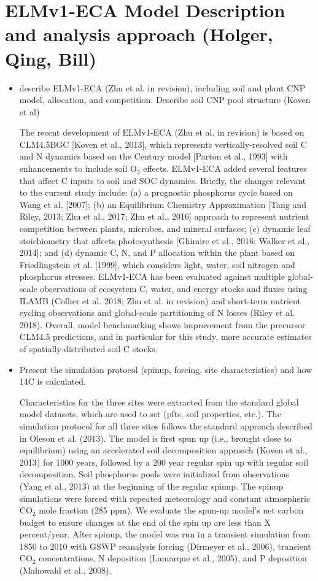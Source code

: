 \documentclass[11pt,a4paper]{article}
\begin{document}
\section*{ELMv1-ECA Model Description and analysis approach (Holger, Qing, Bill)}
\begin{itemize}
    \item describe ELMv1-ECA (Zhu et al. in revision), including soil and plant CNP model, allocation, and competition. Describe soil CNP pool structure (Koven et al)
    
    The recent development of ELMv1-ECA (Zhu et al. in revision) is based on CLM4.5BGC [Koven et al., 2013], which represents vertically-resolved soil C and N dynamics based on the Century model [Parton et al., 1993] with enhancements  to include soil O$_2$ effects. ELMv1-ECA added several features that affect C inputs to soil and SOC dynamics. Briefly, the changes relevant to the current study include: (a) a prognostic phosphorus cycle based on Wang et al. [2007]; (b) an Equilibrium Chemistry Approximation [Tang and Riley, 2013; Zhu et al., 2017; Zhu et al., 2016]  approach to represent nutrient competition between plants, microbes, and mineral surfaces; (c) dynamic leaf stoichiometry that affects photosynthesis [Ghimire et al., 2016; Walker et al., 2014]; and (d) dynamic C, N, and P allocation within the plant based on Friedlingstein et al. [1999], which considers light, water, soil nitrogen and phosphorus stresses. ELMv1-ECA has been evaluated against multiple global-scale observations of ecosystem C, water, and energy stocks and fluxes using ILAMB (Collier et al. 2018; Zhu et al. in revision) and short-term nutrient cycling observations and global-scale partitioning of N losses (Riley et al. 2018). Overall, model benchmarking shows improvement from the precursor CLM4.5 predictions, and in particular for this study, more accurate estimates of spatially-distributed soil C stocks.
    
    \item Present the simulation protocol (spinup, forcing, site characteristics) and how 14C is calculated.
    
    Characteristics for the three sites were extracted from the standard global model datasets, which are used to set (pfts, soil properties, etc.). The simulation protocol for all three sites follows the standard approach described in Oleson et al. (2013). The model is first spun up (i.e., brought close to equilibrium) using an accelerated soil decomposition approach (Koven et al., 2013) for 1000 years, followed by a 200 year regular spin up with regular soil decomposition. Soil phosphorus pools were initialized from observations (Yang et al., 2013) at the beginning of the regular spinup. The spinup simulations were forced with repeated meteorology and constant atmospheric CO$_2$ mole fraction (285 ppm). We evaluate the spun-up model's net carbon budget to ensure changes at the end of the spin up are less than X percent/year. After spinup, the model was run in a transient simulation from 1850 to 2010 with GSWP reanalysis forcing (Dirmeyer et al., 2006), transient CO$_2$ concentrations, N deposition (Lamarque et al., 2005), and P deposition (Mahowald et al., 2008). 
    

\end{itemize}
\end{document}
